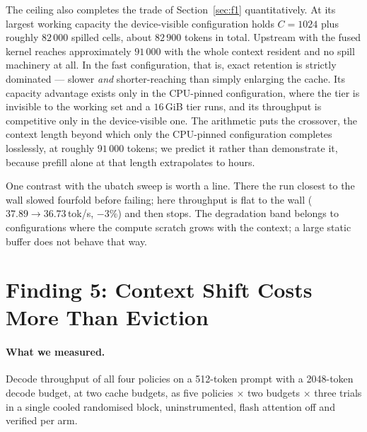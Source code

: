 \documentclass[manuscript,anonymous,review]{acmart}
\begin{document}
The ceiling also completes the trade of Section~\ref{sec:f1}
quantitatively. At its largest working capacity the device-visible
configuration holds $C = 1024$ plus roughly $82\,000$ spilled cells,
about $82\,900$ tokens in total. Upstream with the fused kernel reaches
approximately $91\,000$ with the whole context resident and no spill
machinery at all. In the fast configuration, that is, exact retention
is strictly dominated --- slower \emph{and} shorter-reaching than
simply enlarging the cache. Its capacity advantage exists only in the
CPU-pinned configuration, where the tier is invisible to the working
set and a $16$\,GiB tier runs, and its throughput is competitive only
in the device-visible one. The arithmetic puts the crossover, the
context length beyond which only the CPU-pinned configuration completes
losslessly, at roughly $91\,000$ tokens; we predict it rather than
demonstrate it, because prefill alone at that length extrapolates to
hours.

One contrast with the ubatch sweep is worth a line. There the run
closest to the wall slowed fourfold before failing; here throughput is
flat to the wall ($37.89 \rightarrow 36.73$\,tok/s, $-3\%$) and then
stops. The degradation band belongs to configurations where the
compute scratch grows with the context; a large static buffer does not
behave that way.

\section{Finding 5: Context Shift Costs More Than Eviction}
\label{sec:f5}

\paragraph{What we measured.} Decode throughput of all four policies on
a 512-token prompt with a 2048-token decode budget, at two cache
budgets, as five policies $\times$ two budgets $\times$ three trials in a single cooled
randomised block, uninstrumented, flash attention off and verified per
arm.
\end{document}
